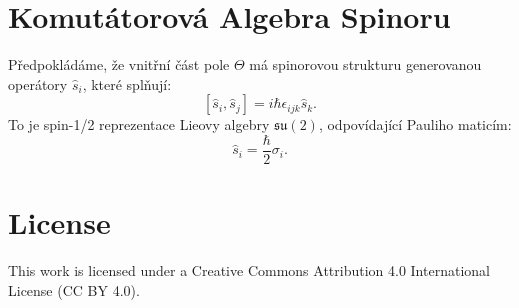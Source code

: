 \documentclass{article}
\begin{document}
\section*{Komutátorová Algebra Spinoru}

Předpokládáme, že vnitřní část pole \(\Theta\) má spinorovou strukturu generovanou operátory \(\hat{s}_i\), které splňují:
\[
[\hat{s}_i, \hat{s}_j] = i \hbar \epsilon_{ijk} \hat{s}_k.
\]
To je spin-1/2 reprezentace Lieovy algebry \(\mathfrak{su}(2)\), odpovídající Pauliho maticím:
\[
\hat{s}_i = \frac{\hbar}{2} \sigma_i.
\]


\section*{License}
This work is licensed under a Creative Commons Attribution 4.0 International License (CC BY 4.0).
\end{document}

